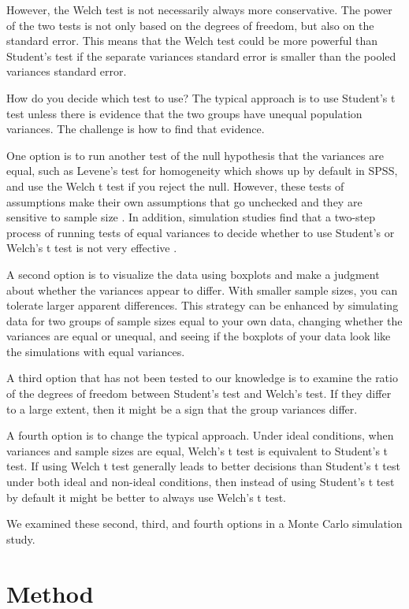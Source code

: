 \documentclass[man,a4paper,noextraspace,apacite]{apa6}\usepackage[]{graphicx}\usepackage[]{color}
\begin{document}
    However, the Welch test is not necessarily always more conservative. The power of the two tests is not only based on the degrees of freedom, but also on the standard error. This means that the Welch test could be more powerful than Student's test if the separate variances standard error is smaller than the pooled variances standard error. 
    
    How do you decide which test to use? The typical approach is to use Student's t test unless there is evidence that the two groups have unequal population variances. The challenge is how to find that evidence. 

    One option is to run another test of the null hypothesis that the variances are equal, such as Levene's test for homogeneity which shows up by default in SPSS, and use the Welch t test if you reject the null. However, these tests of assumptions make their own assumptions that go unchecked and they are sensitive to sample size \cite{Gonzalez2008}. In addition, simulation studies find that a two-step process of running tests of equal variances to decide whether to use Student's or Welch's t test is not very effective \cite{Zimmerman1996,Zimmerman2004}. 

    A second option is to visualize the data using boxplots and make a judgment about whether the variances appear to differ.  With smaller sample sizes, you can tolerate larger apparent differences. This strategy can be enhanced by simulating data for two groups of sample sizes equal to your own data, changing whether the variances are equal or unequal, and seeing if the boxplots of your data look like the simulations with equal variances. 

    A third option that has not been tested to our knowledge is to examine the ratio of the degrees of freedom between Student's test and Welch's test. If they differ to a large extent, then it might be a sign that the group variances differ.

    A fourth option is to change the typical approach. Under ideal conditions, when variances and sample sizes are equal, Welch's t test is equivalent to Student's t test. If using Welch t test generally leads to better decisions than Student's t test under both ideal and non-ideal conditions, then instead of using Student's t test by default it might be better to always use Welch's t test.
    
    We examined these second, third, and fourth options in a Monte Carlo simulation study. 
    
\section{Method}
\end{document}

